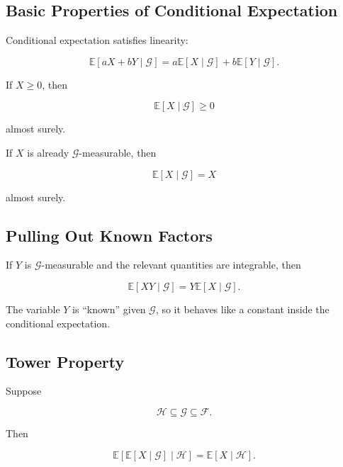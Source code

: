 \subsection{Basic Properties of Conditional Expectation}
\label{subsec:conditional-expectation-properties}

Conditional expectation satisfies linearity:

\[
\boxed{
\mathbb{E}[aX+bY\mid\mathcal{G}]
=
a\mathbb{E}[X\mid\mathcal{G}]
+
b\mathbb{E}[Y\mid\mathcal{G}].
}
\]

If \(X\geq0\), then

\[
\boxed{
\mathbb{E}[X\mid\mathcal{G}]
\geq0
}
\]

almost surely.

If \(X\) is already \(\mathcal{G}\)-measurable, then

\[
\boxed{
\mathbb{E}[X\mid\mathcal{G}]
=
X
}
\]

almost surely.

\subsection{Pulling Out Known Factors}
\label{subsec:pull-out-known-factor}

If \(Y\) is \(\mathcal{G}\)-measurable and the relevant quantities are
integrable, then

\[
\boxed{
\mathbb{E}[XY\mid\mathcal{G}]
=
Y
\mathbb{E}[X\mid\mathcal{G}].
}
\]

The variable \(Y\) is ``known'' given \(\mathcal{G}\), so it behaves like
a constant inside the conditional expectation.

\subsection{Tower Property}
\label{subsec:tower-property-measure}

Suppose

\[
\mathcal{H}
\subseteq
\mathcal{G}
\subseteq
\mathcal{F}.
\]

Then

\[
\boxed{
\mathbb{E}
[
\mathbb{E}[X\mid\mathcal{G}]
\mid
\mathcal{H}
]
=
\mathbb{E}[X\mid\mathcal{H}].
}
\]

